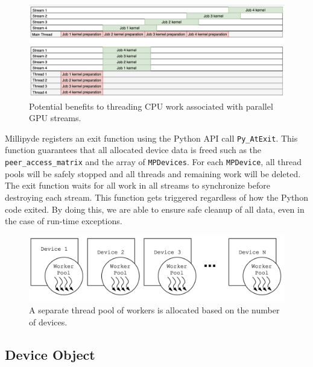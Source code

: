 \begin{figure}[hbtp]
\includegraphics[width=\textwidth]{figures/streamsAndThreads.png}
\centering
\caption{Potential benefits to threading CPU work associated with parallel GPU streams.}
\label{streamsAndThreads}
\end{figure}

\quad Millipyde registers an exit function using the Python API call \verb|Py_AtExit|. This function guarantees that all allocated device data is freed such as the \verb|peer_access_matrix| and the array of \verb|MPDevices|. For each \verb|MPDevice|, all thread pools will be safely stopped and all threads and remaining work will be deleted. The exit function waits for all work in all streams to synchronize before destroying each stream. This function gets triggered regardless of how the Python code exited. By doing this, we are able to ensure safe cleanup of all data, even in the case of run-time exceptions.

\begin{figure}[hbtp]
\includegraphics[width=\textwidth]{figures/devices.png}
\centering
\caption{A separate thread pool of workers is allocated based on the number of devices.}
\label{workers}
\end{figure}


\subsection{Device Object}

